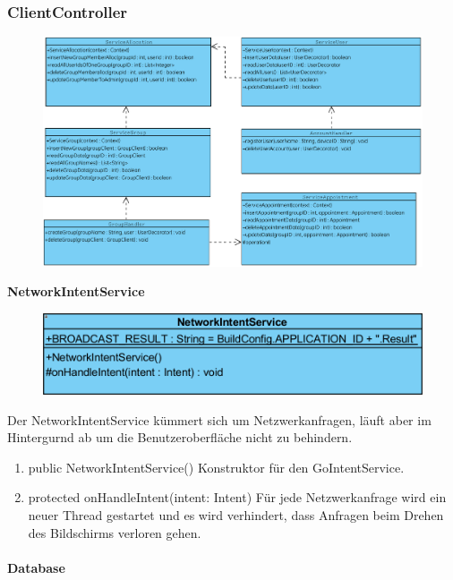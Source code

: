\subsubsection{ClientController}
\begin{figure}[H]
	\includegraphics[scale = .5]{res/umlDiagramms/clientControllerDatabase.pdf}
	\centering
\end{figure}

\textbf{NetworkIntentService}
\begin{figure}[H]
	\includegraphics[scale = .3]{res/umlClasses/NoteIntentService.png}
	\centering
\end{figure}
Der NetworkIntentService kümmert sich um Netzwerkanfragen, läuft aber im Hintergurnd ab um die Benutzeroberfläche nicht zu behindern.
\begin{enumerate}
	\item public NetworkIntentService()
		Konstruktor für den GoIntentService.
	\item protected onHandleIntent(intent: Intent)
		Für jede Netzwerkanfrage wird ein neuer Thread gestartet und es wird verhindert, dass Anfragen beim Drehen des Bildschirms verloren gehen.
\end{enumerate}

\paragraph{Database}

